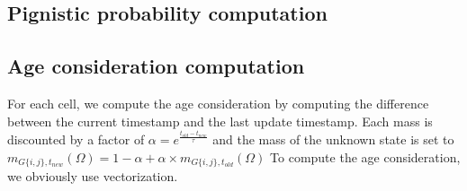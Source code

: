 \subsection{Pignistic probability computation}

\todo

\subsection{Age consideration computation}

For each cell, we compute the age consideration by computing the difference between the current timestamp and the last update timestamp.
Each mass is discounted by a factor of $\alpha = e^{\frac{t_{old}-t_{new}}{\tau}} $ and the mass of the unknown state is set to $m_{G\{i, j\}, t_{new}}(\Omega) = 1 - \alpha + \alpha \times m_{G\{i, j\}, t_{old}}(\Omega)$
To compute the age consideration, we obviously use vectorization.
